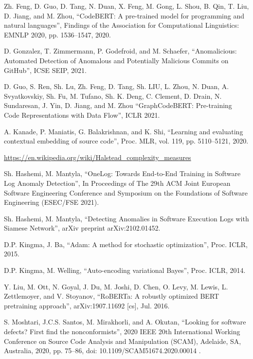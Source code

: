\documentclass[10pt,conference]{IEEEtran}
\begin{document}
\begin{thebibliography}{00}
 Zh. Feng, D. Guo, D. Tang, N. Duan, X. Feng, M. Gong, L. Shou, B. Qin, T. Liu, D. Jiang, and M. Zhou,
``CodeBERT: A pre-trained model for programming and natural languages'',
 Findings of the Association for Computational Linguistics: EMNLP 2020, pp. 1536--1547, 2020.

D. Gonzalez, T. Zimmermann, P. Godefroid, and M. Schaefer,
``Anomalicious: Automated Detection of Anomalous and Potentially Malicious Commits on GitHub'',
ICSE SEIP, 2021.

D. Guo, S. Ren, Sh. Lu, Zh. Feng, D. Tang, Sh. LIU, L. Zhou, N. Duan, A. Svyatkovskiy, Sh. Fu, M. Tufano, Sh. K. Deng, C. Clement, D. Drain, N. Sundaresan, J. Yin, D. Jiang, and M. Zhou
``GraphCodeBERT: Pre-training Code Representations with Data Flow'',
ICLR 2021.

 A. Kanade, P. Maniatis, G. Balakrishnan, and K. Shi,
 ``Learning and evaluating contextual embedding of source code'',
 Proc. MLR, vol. 119, pp. 5110--5121, 2020.

 \url{https://en.wikipedia.org/wiki/Halstead_complexity_measures}

 Sh. Hashemi, M. Mantyla,
 ``OneLog: Towards End-to-End Training in Software Log Anomaly Detection'',
 In Proceedings of The 29th ACM Joint European Software Engineering Conference and Symposium on the Foundations of Software Engineering (ESEC/FSE 2021).

Sh. Hashemi, M. Mantyla,
``Detecting Anomalies in Software Execution Logs with Siamese Network'',
 arXiv preprint arXiv:2102.01452.

 D.P. Kingma, J. Ba,
 ``Adam: A method for stochastic optimization'',
 Proc. ICLR, 2015.

 D.P. Kingma, M. Welling,
 ``Auto-encoding variational Bayes'',
 Proc. ICLR, 2014.

 Y. Liu, M. Ott, N. Goyal, J. Du, M. Joshi, D. Chen, O. Levy, M. Lewis, L. Zettlemoyer, and V. Stoyanov,
 ``RoBERTa: A robustly optimized BERT pretraining approach'',
 arXiv:1907.11692 [cs], Jul. 2016.

 S. Moshtari, J.C.S. Santos, M. Mirakhorli, and A. Okutan,
 ``Looking for software defects? First find the nonconformists'',
 2020 IEEE 20th International Working Conference on Source Code Analysis and Manipulation (SCAM), Adelaide, SA, Australia, 2020, pp. 75--86, doi: 10.1109/SCAM51674.2020.00014 .


\end{thebibliography}
\end{document}
